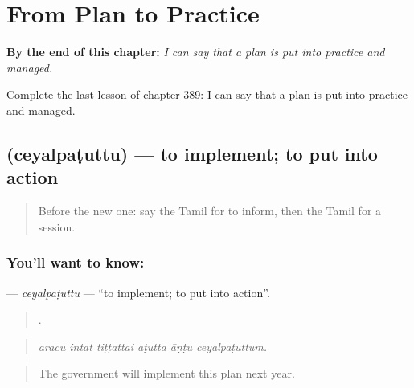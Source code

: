 
\chapter{From Plan to Practice}
\label{ch:ta-from-plan-to-practice}

\begin{chapteropening}
\textbf{By the end of this chapter:} \emph{I can say that a plan is put into practice and managed.}

Complete the last lesson of chapter 389: I can say that a plan is put into practice and managed.
\end{chapteropening}

\section[\texorpdfstring{\ta{செயல்படுத்து} (ceyalpaṭuttu)}{செயல்படுத்து (ceyalpaṭuttu)}]{ (ceyalpaṭuttu) — to implement; to put into action}

\label{lesson:TA-C389-ceyalpatuttu}



\begin{quote}
Before the new one: say the Tamil for to inform, then the Tamil for a session.
\end{quote}

\subsection*{You'll want to know: }
\textbf{} — \emph{ceyalpaṭuttu} — \textquotedblleft{}to implement; to put into action\textquotedblright{}.

\begin{quote}
     .
\end{quote}

\begin{quote}
\emph{aracu intat tiṭṭattai aṭutta āṇṭu ceyalpaṭuttum.}
\end{quote}

\begin{quote}
The government will implement this plan next year.
\end{quote}

